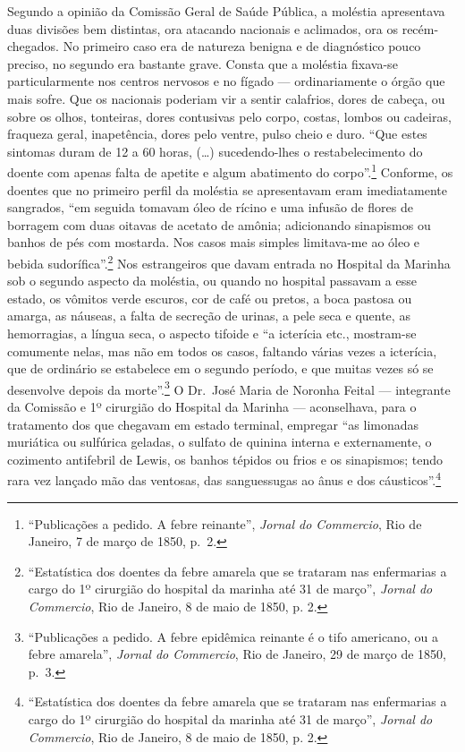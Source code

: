 Segundo a opinião da Comissão Geral de Saúde Pública, a moléstia
apresentava duas divisões bem distintas, ora atacando nacionais e
aclimados, ora os recém-chegados. No primeiro caso era de natureza
benigna e de diagnóstico pouco preciso, no segundo era bastante grave.
Consta que a moléstia fixava-se particularmente nos centros nervosos e
no fígado --- ordinariamente o órgão que mais sofre. Que os nacionais
poderiam vir a sentir calafrios, dores de cabeça, ou sobre os olhos,
tonteiras, dores contusivas pelo corpo, costas, lombos ou cadeiras,
fraqueza geral, inapetência, dores pelo ventre, pulso cheio e duro.
``Que estes sintomas duram de 12 a 60 horas, (\ldots{}) sucedendo-lhes o
restabelecimento do doente com apenas falta de apetite e algum
abatimento do corpo''.\footnote{``Publicações a pedido. A febre
  reinante'', \textit{Jornal do Commercio}, Rio de Janeiro, 7 de março de
  1850, p.~2.} Conforme, os doentes que no primeiro perfil da moléstia
se apresentavam eram imediatamente sangrados, ``em seguida tomavam óleo
de rícino e uma infusão de flores de borragem com duas oitavas de
acetato de amônia; adicionando sinapismos ou banhos de pés com mostarda.
Nos casos mais simples limitava-me ao óleo e bebida
sudorífica''.\footnote{``Estatística dos doentes da febre amarela que se
  trataram nas enfermarias a cargo do 1º cirurgião do hospital da
  marinha até 31 de março'', \textit{Jornal do Commercio}, Rio de Janeiro,
  8 de maio de 1850, p. 2.} Nos estrangeiros que davam entrada no
Hospital da Marinha sob o segundo aspecto da moléstia, ou quando no
hospital passavam a esse estado, os vômitos verde escuros, cor de café
ou pretos, a boca pastosa ou amarga, as náuseas, a falta de secreção de
urinas, a pele seca e quente, as hemorragias, a língua seca, o aspecto
tifoide e ``a icterícia etc., mostram-se comumente nelas, mas não em
todos os casos, faltando várias vezes a icterícia, que de ordinário se
estabelece em o segundo período, e que muitas vezes só se desenvolve
depois da morte''.\footnote{``Publicações a pedido. A febre epidêmica
  reinante é o tifo americano, ou a febre amarela'', \textit{Jornal do
  Commercio}, Rio de Janeiro, 29 de março de 1850, p.~3.} O Dr.~José
Maria de Noronha Feital --- integrante da Comissão e 1º cirurgião do
Hospital da Marinha --- aconselhava, para o tratamento dos que chegavam
em estado terminal, empregar ``as limonadas muriática ou sulfúrica
geladas, o sulfato de quinina interna e externamente, o cozimento
antifebril de Lewis, os banhos tépidos ou frios e os sinapismos; tendo
rara vez lançado mão das ventosas, das sanguessugas ao ânus e dos
cáusticos''.\footnote{``Estatística dos doentes da febre amarela que se
  trataram nas enfermarias a cargo do 1º cirurgião do hospital da
  marinha até 31 de março'', \textit{Jornal do Commercio}, Rio de Janeiro,
  8 de maio de 1850, p. 2.}

